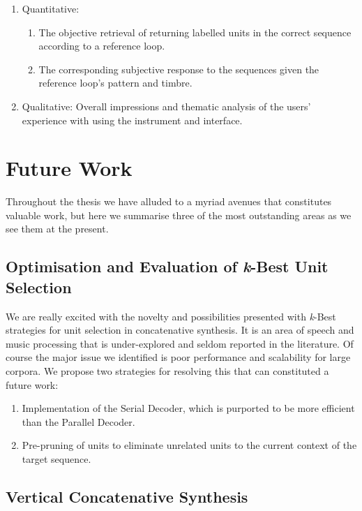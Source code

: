 \begin{enumerate}
  \item Quantitative:
\begin{enumerate}
  \item The objective retrieval of returning labelled units in the correct sequence according to a reference loop.
  \item The corresponding subjective response to the sequences given the reference loop's pattern and timbre.
\end{enumerate}
  \item Qualitative: Overall impressions and thematic analysis of the users' experience with using the instrument and interface.
\end{enumerate}

\section{Future Work}

Throughout the thesis we have alluded to a myriad avenues that constitutes valuable work, but here we summarise three of the most outstanding areas as we see them at the present.

\subsection{Optimisation and Evaluation of \textit{k}-Best Unit Selection}

We are really excited with the novelty and possibilities presented with \textit{k}-Best strategies for unit selection in concatenative synthesis. It is an area of speech and music processing that is under-explored and seldom reported in the literature. Of course the major issue we identified is poor performance and scalability for large corpora. We propose two strategies for resolving this that can constituted a future work:

\begin{enumerate}
  \item Implementation of the Serial Decoder, which is purported to be more efficient than the Parallel Decoder.
  \item Pre-pruning of units to eliminate unrelated units to the current context of the target sequence. 
\end{enumerate}

\subsection{Vertical Concatenative Synthesis}

